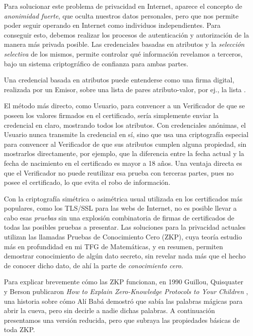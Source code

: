 Para solucionar este problema de privacidad en Internet, aparece el concepto de \textit{anonimidad fuerte}, que oculta nuestros datos personales, pero que nos permite poder seguir operando en Internet como individuos independientes\citep{stronganonymity}. Para conseguir esto, debemos realizar los procesos de autenticación y autorización de la manera más privada posible. Las credenciales basadas en atributos y la \textit{selección selectiva} de los mismos, permite controlar qué información revelamos a terceros, bajo un sistema criptográfico de confianza para ambas partes.

Una credencial basada en atributos puede entenderse como una firma digital, realizada por un Emisor, sobre una lista de pares atributo-valor, por ej., la lista \texttt{}\citep{introCredIBM}.


El método más directo, como Usuario, para convencer a un Verificador de que se poseen los valores firmados en el certificado, sería simplemente enviar la credencial en claro, mostrando todos los atributos. Con credenciales anónimas, el Usuario nunca transmite la credencial en sí, sino que usa una criptografía especial para convencer al Verificador de que sus atributos cumplen alguna propiedad, sin mostrarlos directamente, por ejemplo, que la diferencia entre la fecha actual y la fecha de nacimiento en el certificado es mayor a 18 años. Una ventaja directa es que el Verificador no puede reutilizar esa prueba con terceras partes, pues no posee el certificado, lo que evita el robo de información.


Con la criptografía simétrica o asimétrica usual utilizada en los certificados más populares, como los TLS/SSL para las webs de Internet, no es posible llevar a cabo esas \textit{pruebas} sin una explosión combinatoria de firmas de certificados de todas las posibles pruebas a presentar. Las soluciones para la privacidad actuales utilizan las llamadas Pruebas de Conocimiento Cero (ZKP), cuya teoría estudio más en profundidad en mi TFG de Matemáticas\citep{tfgmates}, y en resumen, permiten demostrar conocimiento de algún dato secreto, sin revelar nada más que el hecho de conocer dicho dato, de ahí la parte de \textit{conocimiento cero}.

Para explicar brevemente cómo las ZKP funcionan, en 1990 Guillou, Quisquater y Berson publicaron \textit{How to Explain Zero-Knowledge Protocols to Your Children} \citep{ZKPcave:story}, una historia sobre cómo Alí Babá demostró que sabía las palabras mágicas para abrir la cueva, pero sin decirle a nadie dichas palabras. A continuación presentamos una versión reducida, pero que subraya las propiedades básicas de toda ZKP.

